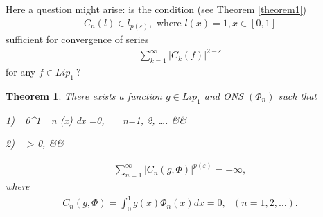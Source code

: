 \documentclass{publmathdeb}
\newtheorem{theorem}{Theorem}[section]
\begin{document}
	Here a question might arise: is the condition (see Theorem \ref{theorem1})
	\begin{eqnarray*}
		C_n(l) \in l_{p(\varepsilon)}, \text{ where } l(x) = 1, x \in [0,1]
	\end{eqnarray*}
	sufficient for convergence of series
	\begin{eqnarray*}
		\sum_{k=1}^{\infty} \left| C_{k}(f)\right|^{2- \varepsilon}
	\end{eqnarray*}
	for any $f\in Lip_1 \ ?$
	
	\begin{theorem}
		\label{theorem6} 
		There exists a function $g \in Lip_1$ and ONS $(\Phi_n)$  such that 
		\begin{flalign*}
			1) \int_{0}^{1} \Phi_n (x) dx =0,  \ \ \ n=1, 2, \dots . && 
		\end{flalign*}
		\begin{flalign*}
			2) \  \varepsilon > 0, && 
		\end{flalign*}
		\begin{eqnarray*}
			\sum_{n=1}^{\infty} \left|C_n(g, \Phi)\right| ^{p(\varepsilon)} =+ \infty, 
		\end{eqnarray*}
		where 
		\begin{eqnarray*}
			C_n(g,\Phi)= \int_{0}^{1} g(x) \Phi_n (x) dx =0,  \ \ \ (n=1, 2, \dots).
		\end{eqnarray*}
		
	\end{theorem}
	
\end{document}
